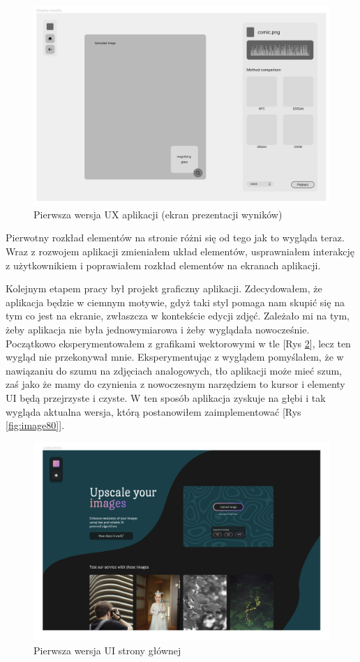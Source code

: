 \begin{figure}[ht]
    \centering
    \includegraphics[width=0.8\linewidth]{Rozdziały/06.Aplikacja/Obrazy/UX display.png}  
    \caption{Pierwsza wersja UX aplikacji (ekran prezentacji wyników)}
    \label{fig:image84}
\end{figure}

Pierwotny rozkład elementów na stronie różni się od tego jak to wygląda teraz. Wraz z rozwojem aplikacji zmieniałem układ elementów, usprawniałem interakcję z użytkownikiem i poprawiałem rozkład elementów na ekranach aplikacji.

Kolejnym etapem pracy był projekt graficzny aplikacji. Zdecydowałem, że aplikacja będzie w ciemnym motywie, gdyż taki styl pomaga nam skupić się na tym co jest na ekranie, zwłaszcza w kontekście edycji zdjęć. Zależało mi na tym, żeby aplikacja nie była jednowymiarowa i żeby wyglądała nowocześnie. Początkowo eksperymentowałem z grafikami wektorowymi w tle [Rys \ref{fig:image85}], lecz ten wygląd nie przekonywał mnie. Eksperymentując z wyglądem pomyślałem, że w nawiązaniu do szumu na zdjęciach analogowych, tło aplikacji może mieć szum, zaś jako że mamy do czynienia z nowoczesnym narzędziem to kursor i elementy UI będą przejrzyste i czyste. W ten sposób aplikacja zyskuje na głębi i tak wygląda aktualna wersja, którą postanowiłem zaimplementować [Rys \ref{fig:image80}].

\begin{figure}[H]
    \centering
    \includegraphics[width=0.8\linewidth]{Rozdziały/06.Aplikacja/Obrazy/UI 1.png}  
    \caption{Pierwsza wersja UI strony głównej}
    \label{fig:image85}
\end{figure}

